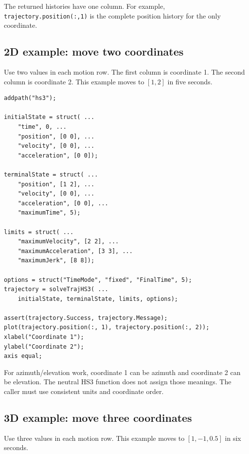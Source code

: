 \documentclass[10pt,letterpaper]{article}
\newcommand{\file}[1]{\nolinkurl{#1}}
\begin{document}
The returned histories have one column. For example,
\file{trajectory.position(:,1)} is the complete position history for the only
coordinate.

\subsection{2D example: move two coordinates}

Use two values in each motion row. The first column is coordinate 1. The second
column is coordinate 2. This example moves to $[1,2]$ in five seconds.

\begin{lstlisting}
addpath("hs3");

initialState = struct( ...
    "time", 0, ...
    "position", [0 0], ...
    "velocity", [0 0], ...
    "acceleration", [0 0]);

terminalState = struct( ...
    "position", [1 2], ...
    "velocity", [0 0], ...
    "acceleration", [0 0], ...
    "maximumTime", 5);

limits = struct( ...
    "maximumVelocity", [2 2], ...
    "maximumAcceleration", [3 3], ...
    "maximumJerk", [8 8]);

options = struct("TimeMode", "fixed", "FinalTime", 5);
trajectory = solveTrajHS3( ...
    initialState, terminalState, limits, options);

assert(trajectory.Success, trajectory.Message);
plot(trajectory.position(:, 1), trajectory.position(:, 2));
xlabel("Coordinate 1");
ylabel("Coordinate 2");
axis equal;
\end{lstlisting}

For azimuth/elevation work, coordinate 1 can be azimuth and coordinate 2 can be
elevation. The neutral HS3 function does not assign those meanings. The caller
must use consistent units and coordinate order.

\subsection{3D example: move three coordinates}

Use three values in each motion row. This example moves to
$[1,-1,0.5]$ in six seconds.
\end{document}
